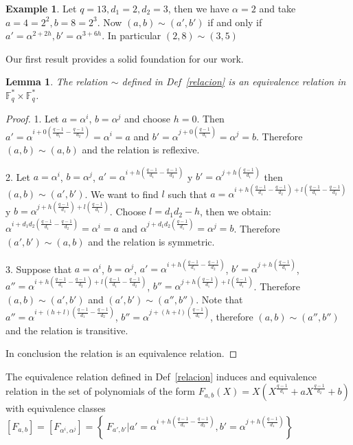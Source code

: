 \documentclass{article}
\newtheorem{lemma}[theorem]{Lemma}
\theoremstyle{definition}
\newtheorem{example}[theorem]{Example}
\theoremstyle{remark}
\numberwithin{equation}{section}
\begin{document}
 \begin{example}
    Let $q = 13, d_1 = 2, d_2 = 3$, then we have $\alpha = 2$ and take $a = 4 = 2^2, b = 8 = 2^3$. Now $(a,b) \sim (a',b')$ if and only if
    $a' = \alpha^{2+2h}, b' = \alpha^{3+6h}$. In particular $(2,8) \sim (3,5)$
  \end{example}

Our first result provides a solid foundation for our work.

\begin{lemma}
  
  The relation $\sim$ defined in Def~\ref{relacion} is an equivalence relation in $\mathbb{F}_q^* \times \mathbb{F}_q^*$.

\end{lemma}

\begin{proof}
  
  1. Let $a=\alpha^i$, $b=\alpha^j$ and choose $h=0$. Then $a' = \alpha^{i+0(\frac{q-1}{d_1}-\frac{q-1}{d_2})} = \alpha^i = a$ and $b' = \alpha^{j+0(\frac{q-1}{d_1})} = \alpha^j = b$. Therefore $(a,b) \sim (a,b)$ and the relation is reflexive.

  2. Let $a = \alpha^i$, $b=\alpha^j$, $a' = \alpha^{i+h(\frac{q-1}{d_1}-\frac{q-1}{d_2})}$ y $b' = \alpha^{j+h(\frac{q-1}{d_1})}$ then $(a,b) \sim (a',b')$. We want to find $l$ such that $a = \alpha^{i+h(\frac{q-1}{d_1}-\frac{q-1}{d_2})+l(\frac{q-1}{d_1}-\frac{q-1}{d_2})}$ y $b = \alpha^{j+h(\frac{q-1}{d_1})+l(\frac{q-1}{d_1})}$. Choose $l=d_1d_2-h$, then we obtain: $\alpha^{i+d_1d_2(\frac{q-1}{d_1}-\frac{q-1}{d_2})} = \alpha^i = a$ and $\alpha^{j+d_1d_2(\frac{q-1}{d_1})} = \alpha^j = b$. Therefore $(a',b') \sim (a,b) $ and the relation is symmetric.

  3. Suppose that $a = \alpha^i$, $b=\alpha^j$, $a' = \alpha^{i+h(\frac{q-1}{d_1}-\frac{q-1}{d_2})}$, $b' = \alpha^{j+h(\frac{q-1}{d_1})}$, $a'' = \alpha^{i+h(\frac{q-1}{d_1}-\frac{q-1}{d_2})+l(\frac{q-1}{d_1}-\frac{q-1}{d_2})}$, $b'' = \alpha^{j+h(\frac{q-1}{d_1})+l(\frac{q-1}{d_1})}$. Therefore $(a,b) \sim (a',b')$ and $(a',b') \sim (a'',b'')$. Note that $a'' = \alpha^{i+(h+l)(\frac{q-1}{d_1}-\frac{q-1}{d_2})}$, $b'' = \alpha^{j+(h+l)(\frac{q-1}{d_1})}$, therefore $(a,b) \sim (a'',b'')$ and the relation is transitive.

  In conclusion the relation is an equivalence relation.

\end{proof}

The equivalence relation defined in Def~\ref{relacion} induces and equivalence relation in the set of polynomials of the form $F_{a,b}(X) = X(X^{\frac{q-1}{d_1}} + aX^{\frac{q-1}{d_2}} +b)$ with equivalence classes $[F_{a,b}] = [F_{\alpha^i, \alpha^j}] = \left\{\ F_{a',b'} | a' = \alpha^{i+h(\frac{q-1}{d_1} - \frac{q-1}{d_2})}, b' = \alpha^{j+h(\frac{q-1}{d_1})} \right\}$
\end{document}

